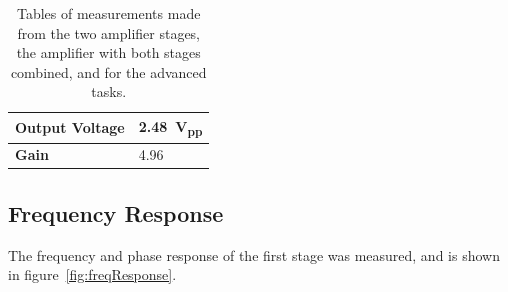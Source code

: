 \documentclass[a4paper,11pt]{article}
\begin{document}
\begin{table}[h]
{\begin{tabular}{|l|l|}
                \textbf{Output Voltage} & \SI{2.48}{\volt_{pp}}         \\ \hline
                \textbf{Gain}           & 4.96                          \\ \hline
            \end{tabular}
            \label{tab:scombgain}
        }
        \qquad
        \caption{Tables of measurements made from the two amplifier stages, the amplifier with both stages combined, and for the advanced tasks.}
        \label{tab:gain}
    \end{table}
        
    \subsection{Frequency Response}
        The frequency and phase response of the first stage was measured, and is shown in figure~\ref{fig:freqResponse}.
        
\end{document}
